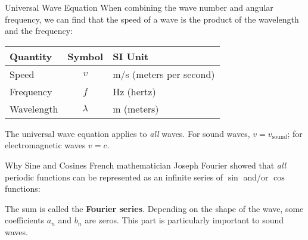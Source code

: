 \documentclass[12pt,aspectratio=169]{beamer}
\newcommand{\eq}[2]{\vspace{#1}{\Large\begin{displaymath}#2\end{displaymath}}}
\begin{document}
\begin{frame}{Universal Wave Equation}
  When combining the wave number and angular frequency, we can find that
  the speed of a wave is the product of the wavelength and the frequency:

  \eq{-.2in}{
    \boxed{v = f\lambda}
  }
  \begin{center}
    \begin{tabular}{l|c|l}
      \rowcolor{pink}
      \textbf{Quantity} & \textbf{Symbol} & \textbf{SI Unit} \\ \hline
      Speed         & $v$       & \si{m/s} (meters per second) \\
      Frequency     & $f$       & \si{\hertz} (hertz)\\
      Wavelength    & $\lambda$ & \si{\metre} (meters)
    \end{tabular}
  \end{center}
  The universal wave equation applies to \emph{all} waves. For sound waves,
  $v=v_\mathrm{sound}$; for electromagnetic waves $v=c$.
\end{frame}


\begin{frame}{Why Sine and Cosines}
  French mathematician Joseph Fourier showed that \emph{all} periodic functions
  can be represented as an infinite series of $\sin$ and/or $\cos$ functions:


  The sum is called the \textbf{Fourier series}. Depending on the shape of the
  wave, some coefficients $a_n$ and $b_n$ are zeros. This part is particularly
  important to sound waves.
\end{frame}
\end{document}
